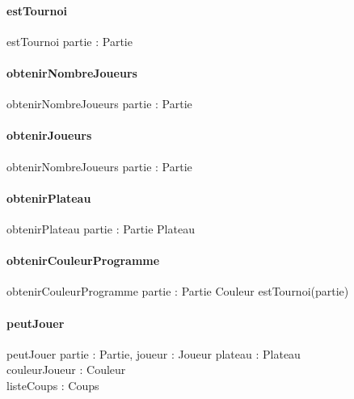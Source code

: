 \paragraph{estTournoi}
\begin{algorithme}
	\small
	\fonction
  	{estTournoi}
  	{partie : Partie}
  	{\booleen}
  	{}
  	{
  	}
\end{algorithme}

\paragraph{obtenirNombreJoueurs}
\begin{algorithme}
	\small
	\fonction
  	{obtenirNombreJoueurs}
  	{partie : Partie}
  	{\naturel}
  	{}
  	{
  	}
\end{algorithme}

\paragraph{obtenirJoueurs}
\begin{algorithme}
	\small
	\fonction
  	{obtenirNombreJoueurs}
  	{partie : Partie}
    {}
  	{}
  	{
  	}
\end{algorithme}

\paragraph{obtenirPlateau}
\begin{algorithme}
	\small
	\fonction
	{obtenirPlateau}
    {partie : Partie}
    {Plateau}
  	{}
  	{
  	}
\end{algorithme}

\paragraph{obtenirCouleurProgramme}
\begin{algorithme}
	\small
	\fonctionAvecPreconditions
	{obtenirCouleurProgramme}
    {partie : Partie}
    {Couleur}
    {estTournoi(partie)}
  	{}
  	{
  	}
\end{algorithme}


\paragraph{peutJouer}
\begin{algorithme}
	\small
	\fonction
	{peutJouer}
    {partie : Partie, joueur : Joueur}
    {\booleen}
  	{plateau : Plateau \\
  	couleurJoueur : Couleur \\
  	listeCoups : Coups}
  	{
  	}
\end{algorithme}

